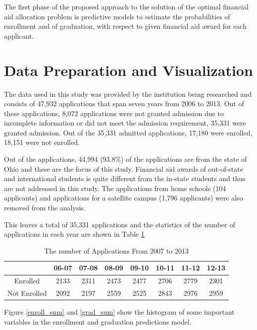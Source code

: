 \documentclass[12pt,english]{report}
\begin{document}
The first phase of the proposed approach to the solution of the optimal
financial aid allocation problem is predictive models to estimate the
probabilities of enrollment and of graduation, with respect to given financial
aid award for each applicant.

\section{Data Preparation and Visualization}
The data used in this study was provided by the institution being researched
and consists of 47,932 applications that span seven years from 2006 to 2013.
Out of these applications, 8,072 applications were not granted admission due to
incomplete information or did not meet the admission requirement, 35,331 were
granted admission. Out of the 35,331 admitted applications, 17,180 were
enrolled, 18,151 were not enrolled.

Out of the applications, 44,994 (93.8\%) of the applications are from the state
of Ohio and these are the focus of this study. Financial aid awards of
out-of-state and international students is quite different from the in-state
students and thus are not addressed in this study. The applications from home
schools (104 applicants) and applications for a satellite campus (1,796
applicants) were also removed from the analysis.

This leaves a total of 35,331 applications and the statistics of the number of
applications in each year are shown in Table \ref{enroll_year_sum}
\begin{table}[ht]
\centering
\begin{tabular}{|c|c|c|c|c|c|c|c|}
\hline
          & 06-07 & 07-08 & 08-09 & 09-10 & 10-11 & 11-12 & 12-13 \\ \hline
Enrolled  & 2133  & 2311  & 2473  & 2477  & 2706  & 2779  & 2301  \\
\hline
Not Enrolled   & 2092  & 2197  & 2559  & 2525  & 2843  & 2976  & 2959
\\ \hline
\end{tabular}
\caption{The number of Applications From 2007 to 2013}
\label{enroll_year_sum}
\end{table}




Figure \ref{enroll_sum} and \ref{grad_sum} show the histogram of some 
important variables in the enrollment and graduation predictions model.
\end{document}
